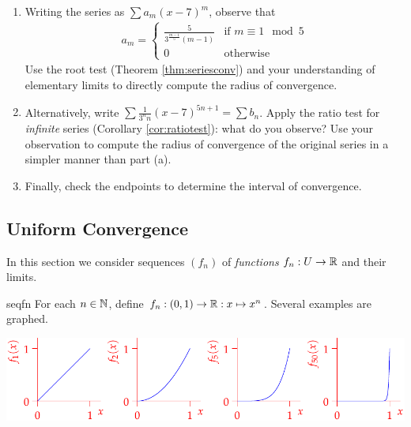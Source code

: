 \begin{exercises}
\begin{enumerate}
\begin{enumerate}
		  \item Writing the series as $\sum a_m(x-7)^m$, observe that
		  \begin{gather*}
				a_m=\begin{cases}
				\frac 5{3^{\frac{m-1}5}(m-1)}&\text{if $m\equiv 1\mod 5$}\\
				0&\text{otherwise}
			\end{cases}%
			\end{gather*}
		  Use the root test (Theorem \ref{thm:seriesconv}) and your understanding of elementary limits to directly compute the radius of convergence.
		  
		  \item Alternatively, write $\sum \frac{1}{3^nn}(x-7)^{5n+1}=\sum b_n$. Apply the ratio test for \emph{infinite} series (Corollary \ref{cor:ratiotest}): what do you observe? Use your observation to compute the radius of convergence of the original series in a simpler manner than part (a).
		  
		  \item Finally, check the endpoints to determine the interval of convergence.
		\end{enumerate}
		
	\end{enumerate}
\end{exercises}


\clearpage
\iffalse


\subsection{Uniform Convergence}\label{sec:uniformconv}

In this section we consider sequences $(f_n)$ of \emph{functions} $f_n:U\to\mathbb{R}$ and their limits.

\begin{example}{}{seqfn}
	For each $n\in\mathbb{N}$, define $f_n:(0,1)\to\mathbb{R}:x\mapsto x^n$. Several examples are graphed.
	\begin{center}
		\includegraphics{seqex1}
	\end{center}
\end{example}

